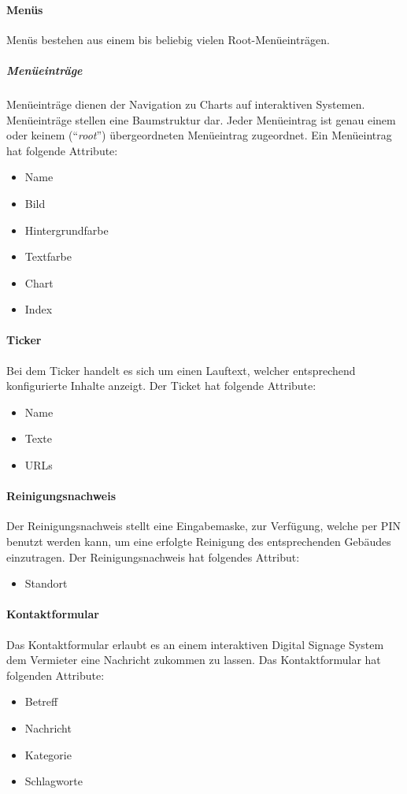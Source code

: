 \documentclass[a4paper]{article}
\begin{document}
	\paragraph{Menüs}
	Menüs bestehen aus einem bis beliebig vielen Root-Menüeinträgen.
	\subparagraph{Menüeinträge}
	Menüeinträge dienen der Navigation zu Charts auf interaktiven Systemen.
	Menüeinträge stellen eine Baumstruktur dar. Jeder Menüeintrag ist genau einem oder keinem (\enquote{\emph{root}}) übergeordneten Menüeintrag zugeordnet.
	Ein Menüeintrag hat folgende Attribute:
	\begin{itemize}
	\item Name
	\item Bild
	\item Hintergrundfarbe
	\item Textfarbe
	\item Chart
	\item Index
	\end{itemize}
	\paragraph{Ticker}
	Bei dem Ticker handelt es sich um einen Lauftext, welcher entsprechend konfigurierte Inhalte anzeigt.
	Der Ticket hat folgende Attribute:
	\begin{itemize}
	\item Name
	\item Texte
	\item URLs
	\end{itemize}
	\paragraph{Reinigungsnachweis}
	Der Reinigungsnachweis stellt eine Eingabemaske, zur Verfügung, welche per PIN benutzt werden kann, um eine erfolgte Reinigung des entsprechenden Gebäudes einzutragen.
	Der Reinigungsnachweis hat folgendes Attribut:
	\begin{itemize}
	\item Standort
	\end{itemize}
	\paragraph{Kontaktformular}
	Das Kontaktformular erlaubt es an einem interaktiven Digital Signage System dem Vermieter eine Nachricht zukommen zu lassen.
	Das Kontaktformular hat folgenden Attribute:
	\begin{itemize}
	\item Betreff
	\item Nachricht
	\item Kategorie
	\item Schlagworte
	\end{itemize}
\end{document}
